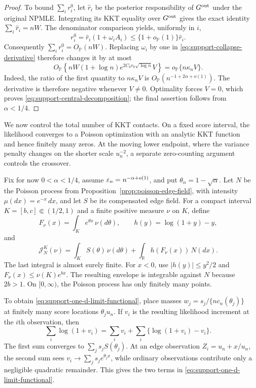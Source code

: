 \begin{proof}
To bound \(\sum_i r_i^0\), let \(\widehat r_i\) be the posterior
responsibility of \(G^{\rm out}\) under the original NPMLE. Integrating its
KKT equality over \(G^{\rm out}\) gives the exact identity
\(\sum_i\widehat r_i=nW\). The denominator comparison yields, uniformly in
\(i\),
\[
    r_i^0=\widehat r_i(1+\omega_iA_i)
    \le \{1+o_{\mathbb P}(1)\}\widehat r_i.
\]
Consequently \(\sum_i r_i^0=O_{\mathbb P}(nW)\). Replacing \(\omega_i\) by
one in \eqref{eq:support-collapse-derivative} therefore changes it by at most
\[
    O_{\mathbb P}\!\left\{
      nW(1+\log n)e^{2C_0r_0\sqrt{\log n}}V
    \right\}
    =o_{\mathbb P}\{n\kappa_nV\}.
\]
Indeed, the ratio of the first quantity to \(n\kappa_nV\) is
\(O_{\mathbb P}(n^{-1+2\alpha+o(1)})\). The derivative is
therefore negative whenever \(V\ne0\). Optimality forces \(V=0\), which proves
\eqref{eq:support-central-decomposition}; the final assertion follows from
\(\alpha<1/4\).
\end{proof}


We now control the total number of KKT contacts. On a fixed score interval,
the likelihood converges to a Poisson optimization with an analytic KKT
function and hence finitely many zeros. At the moving lower endpoint, where
the variance penalty changes on the shorter scale \(u_n^{-2}\), a separate
zero-counting argument controls the crossover.

Fix for now \(0<\alpha<1/4\), assume
\(\varepsilon_n=n^{-\alpha+o(1)}\), and put
\(\theta_\alpha=1-\sqrt\alpha\). Let \(N\) be the Poisson process from
Proposition~\ref{prop:poisson-edge-field}, with intensity
\(\mu(dx)=e^{-x}\,dx\), and let \(S\) be its compensated edge field. For a
compact interval \(K=[b,c]\Subset(1/2,1)\) and a finite positive measure
\(\nu\) on \(K\), define
\[
    F_\nu(x)=\int_K e^{\theta x}\,\nu(d\theta),
    \qquad
    h(y)=\log(1+y)-y,
\]
and
\begin{equation}
\label{eq:support-one-d-limit-functional}
    \mathcal J_N^K(\nu)
    =\int_KS(\theta)\,\nu(d\theta)
      +\int_{\mathbb R}h(F_\nu(x))\,N(dx).
\end{equation}
The last integral is almost surely finite. For \(x<0\), use
\(|h(y)|\le y^2/2\) and \(F_\nu(x)\le\nu(K)e^{bx}\). The resulting
envelope is integrable against \(N\) because \(2b>1\). On
\([0,\infty)\), the Poisson process has only finitely many points.

To obtain \eqref{eq:support-one-d-limit-functional}, place masses
\(w_j=s_j/\{nc_n(\theta_j)\}\) at finitely many score locations
\(\theta_j u_n\). If \(v_i\) is the resulting likelihood increment at the
\(i\)th observation, then
\[
    \sum_i\log(1+v_i)
    =\sum_iv_i+\sum_i\{\log(1+v_i)-v_i\}.
\]
The first sum converges to \(\sum_js_jS(\theta_j)\). At an edge observation
\(Z_i=u_n+x/u_n\), the second sum sees
\(v_i\to\sum_js_je^{\theta_jx}\), while ordinary observations contribute
only a negligible quadratic remainder. This gives the two terms in
\eqref{eq:support-one-d-limit-functional}.


